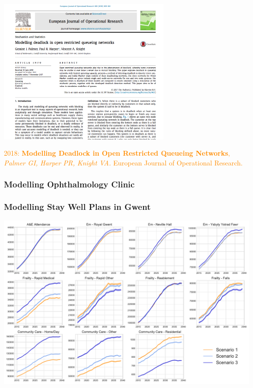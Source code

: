 \documentclass{beamer}
\begin{document}
\begin{frame}
\begin{center}
  \includegraphics[width=0.65\textwidth]{deadlockpaper}
\end{center}
\small{\textcolor{darkorange}{2018: \textbf{Modelling Deadlock in Open Restricted Queueing Networks}, \textit{Palmer GI, Harper PR, Knight VA.} European Journal of Operational Research.}}
\end{frame}

\begin{frame}
\frametitle{Modelling Ophthalmology Clinic}
\begin{figure}
    
\end{figure}
\end{frame}

\begin{frame}
\frametitle{Modelling Stay Well Plans in Gwent}
\begin{center}
  
\end{center}
\end{frame}

\begin{frame}
\begin{center}
  \includegraphics[width=\textwidth]{results_years}
\end{center}
\end{frame}
\end{document}
